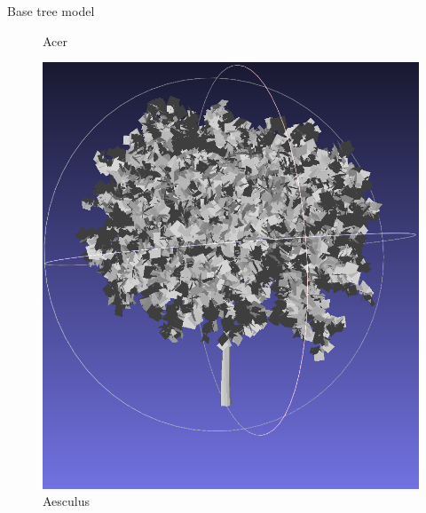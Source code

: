 \documentclass[10pt]{beamer}
\begin{document}
\begin{frame}{Base tree model}
\begin{figure}[H]
\begin{minipage}{0.24\textwidth}
        \caption{Acer}
    \end{minipage}\hfill
    \begin{minipage}{0.24\textwidth}
        \centering
        \includegraphics[width=\textwidth]{images/aesculus.png}
        \caption{Aesculus}
    \end{minipage}\hfill
    \begin{minipage}{0.24\textwidth}
        \centering

\end{minipage}
\end{figure}
\end{frame}
\end{document}
